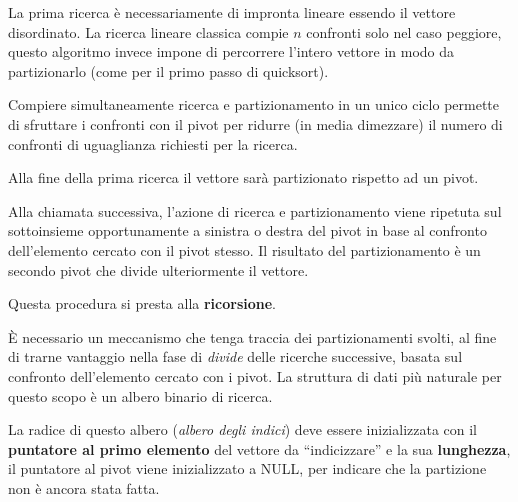 \documentclass{article}
\begin{document}
    La prima ricerca è necessariamente di impronta lineare essendo il vettore
    disordinato.
    La ricerca lineare classica compie $n$ confronti solo nel caso
    peggiore, questo algoritmo invece impone di percorrere l'intero vettore in
    modo da partizionarlo (come per il primo passo di quicksort).

    Compiere simultaneamente ricerca e partizionamento in un unico ciclo
    permette di sfruttare i confronti con il pivot per ridurre (in media
    dimezzare) il numero di confronti di uguaglianza richiesti per la ricerca.

    Alla fine della prima ricerca il vettore sarà partizionato rispetto ad un
    pivot.

    Alla chiamata successiva, l'azione di ricerca e partizionamento viene
    ripetuta sul sottoinsieme opportunamente a sinistra o destra del pivot in
    base al confronto dell'elemento cercato con il pivot stesso. Il risultato
    del partizionamento è un secondo pivot che divide ulteriormente il vettore.

    Questa procedura si presta alla \textbf{ricorsione}.

    È necessario un meccanismo che tenga traccia dei partizionamenti svolti, al
    fine di trarne vantaggio nella fase di \textit{divide} delle ricerche
    successive, basata sul confronto dell'elemento cercato con i pivot. La
    struttura di dati più naturale per questo scopo è un albero binario di
    ricerca.

    La radice di questo albero (\textit{albero degli indici}) deve essere
    inizializzata con il \textbf{puntatore al primo elemento} del vettore da
    “indicizzare” e la sua \textbf{lunghezza}, il puntatore al pivot viene
    inizializzato a NULL, per indicare che la partizione non è ancora stata
    fatta.
\end{document}
